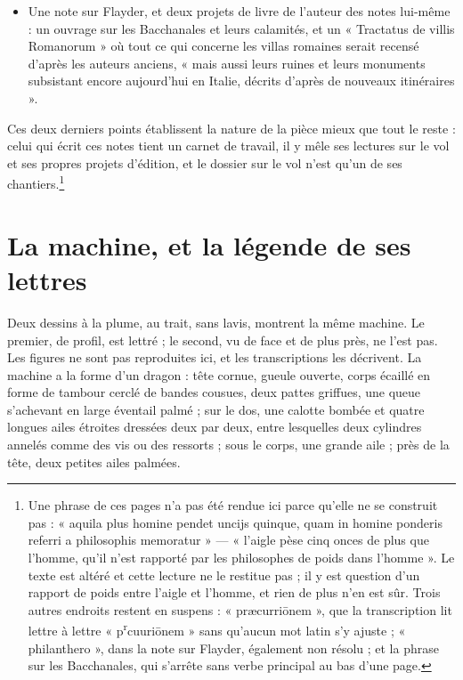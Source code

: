 \documentclass[11pt,a4paper]{article}
\begin{document}
\begin{itemize}
    vautour par l'odorat, le renard par l'ouïe, les chiens par l'un et l'autre,
    la poule par le goût, l'aigle par la vue, les limaces et les huîtres par le
    toucher, le lièvre à la course, le poisson à la nage, l'oiseau au vol ».
  \item Une note sur Flayder, et deux projets de livre de l'auteur des notes
    lui-même : un ouvrage sur les Bacchanales et leurs calamités, et un
    « Tractatus de villis Romanorum » où tout ce qui concerne les villas
    romaines serait recensé d'après les auteurs anciens, « mais aussi leurs
    ruines et leurs monuments subsistant encore aujourd'hui en Italie, décrits
    d'après de nouveaux itinéraires ».
\end{itemize}

Ces deux derniers points établissent la nature de la pièce mieux que tout le
reste : celui qui écrit ces notes tient un carnet de travail, il y mêle ses
lectures sur le vol et ses propres projets d'édition, et le dossier sur le vol
n'est qu'un de ses chantiers.\footnote{Une phrase de ces pages n'a pas été
rendue ici parce qu'elle ne se construit pas : « aquila plus homine pendet
uncijs quinque, quam in homine ponderis referri a philosophis memoratur » —
« l'aigle pèse cinq onces de plus que l'homme, qu'il n'est rapporté par les
philosophes de poids dans l'homme ». Le texte est altéré et cette lecture ne le
restitue pas ; il y est question d'un rapport de poids entre l'aigle et l'homme,
et rien de plus n'en est sûr. Trois autres endroits restent en suspens :
« præcurriōnem », que la transcription lit lettre à lettre
« p\textsuperscript{r}cuuriōnem » sans qu'aucun mot latin s'y ajuste ;
« philanthero », dans la note sur Flayder, également non résolu ; et la phrase
sur les Bacchanales, qui s'arrête sans verbe principal au bas d'une page.}

\section*{La machine, et la légende de ses lettres}

Deux dessins à la plume, au trait, sans lavis, montrent la même machine. Le
premier, de profil, est lettré ; le second, vu de face et de plus près, ne l'est
pas. Les figures ne sont pas reproduites ici, et les transcriptions les
décrivent. La machine a la forme d'un dragon : tête cornue, gueule ouverte,
corps écaillé en forme de tambour cerclé de bandes cousues, deux pattes
griffues, une queue s'achevant en large éventail palmé ; sur le dos, une calotte
bombée et quatre longues ailes étroites dressées deux par deux, entre lesquelles
deux cylindres annelés comme des vis ou des ressorts ; sous le corps, une grande
aile ; près de la tête, deux petites ailes palmées.
\end{document}
